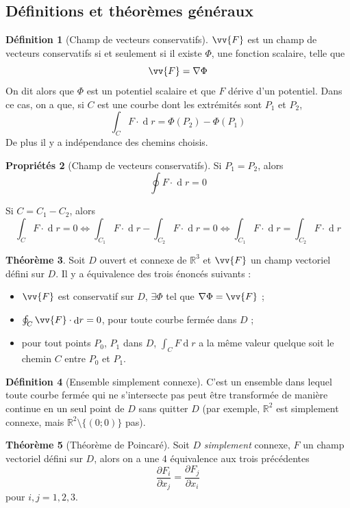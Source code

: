 \documentclass[11pt,a4paper]{article}
\theoremstyle{definition}
\newtheorem{mydef}{Définition}%
\newtheorem{myprop}[mydef]{Propriétés}
\newtheorem{mytheo}[mydef]{Théorème}
\DeclareMathOperator{\diff}{d}
\newcommand{\dif}{\diff\!}
\newcommand{\pa}{\partial}
\newcommand{\R}{\mathbb{R}}
\begin{document}
\subsection{Définitions et théorèmes généraux}

\begin{mydef}[Champ de vecteurs conservatifs] $\vv{F}$ est un champ de vecteurs conservatifs si et seulement si il existe $\Phi$, une fonction scalaire, telle que
	\[ \vv{F} = \nabla \Phi \]
	On dit alors que $\Phi$ est un potentiel scalaire et que $F$ dérive d'un potentiel.
	Dans ce cas, on a que, si $C$ est une courbe dont les extrémités sont $P_1$ et $P_2$,
	\[ \int_C F \cdot \dif r = \Phi(P_2) - \Phi(P_1) \]
	De plus il y a indépendance des chemins choisis.
\end{mydef}

\begin{myprop}[Champ de vecteurs conservatifs]
	Si $P_1 = P_2$, alors
	\[ \oint F \cdot \dif r = 0 \]

	Si $C = C_1 - C_2$, alors
	\[ \int_C F \cdot \dif r = 0 \Leftrightarrow \int_{C_1} F \cdot \dif r - \int_{C_2} F \cdot \dif r = 0
	\Leftrightarrow \int_{C_1} F \cdot \dif r = \int_{C_2} F \cdot \dif r \]
\end{myprop}

\begin{mytheo} Soit $D$ ouvert et connexe de $\R^3$ et $\vv{F}$ un champ vectoriel défini sur $D$. Il y a équivalence des trois énoncés suivants :
	\begin{itemize}
		\item $\vv{F}$ est conservatif sur $D$, $\exists \Phi$ tel que $\nabla \Phi = \vv{F}$ ;
		\item $\oint_C \vv{F} \cdot \dif r = 0$, pour toute courbe fermée dans $D$ ;
		\item pour tout points $P_0$, $P_1$ dans $D$, $\int_C F \dif r$ a la même valeur quelque soit le chemin $C$ entre $P_0$ et $P_1$.
	\end{itemize}
\end{mytheo}

\begin{mydef}[Ensemble simplement connexe] C'est un ensemble dans lequel toute courbe fermée qui ne s'intersecte pas peut être transformée de manière continue en un seul point de $D$ sans quitter $D$ (par exemple, $\R^2$ est simplement connexe, mais $\R^2 \setminus \{(0;0)\}$ pas).
\end{mydef}

\begin{mytheo}[Théorème de Poincaré] Soit $D$ \emph{simplement} connexe, $F$ un champ vectoriel défini sur $D$, alors on a une 4\ieme{} équivalence aux trois précédentes
	\[ \frac{\pa F_i}{\pa x_j} = \frac{\pa F_j}{\pa x_i} \]
	pour $i,j = 1,2,3$.
\end{mytheo}
\end{document}
